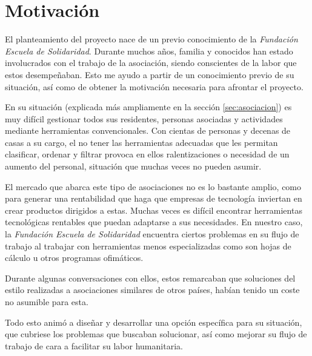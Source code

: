 \section{Motivación}

El planteamiento del proyecto nace de un previo conocimiento de la \textit{Fundación Escuela de Solidaridad}. Durante muchos años, familia y conocidos han estado involucrados con el trabajo de la asociación, siendo conscientes de la labor que estos desempeñaban. Esto me ayudo a partir de un conocimiento previo de su situación, así como de obtener la motivación necesaria para afrontar el proyecto.

En su situación (explicada más ampliamente en la sección \ref{sec:asociacion}) es muy difícil gestionar todos sus residentes, personas asociadas y actividades mediante herramientas convencionales. Con cientas de personas y decenas de casas a su cargo, el no tener las herramientas adecuadas que les permitan clasificar, ordenar y filtrar provoca en ellos ralentizaciones o necesidad de un aumento del personal, situación que muchas veces no pueden asumir. 

El mercado que abarca este tipo de asociaciones no es lo bastante amplio, como para generar una rentabilidad que haga que empresas de tecnología inviertan en crear productos dirigidos a estas. Muchas veces es difícil encontrar herramientas tecnológicas rentables que puedan adaptarse a sus necesidades. En nuestro caso, la \textit{Fundación Escuela de Solidaridad} encuentra ciertos problemas en su flujo de trabajo al trabajar con herramientas menos especializadas como son hojas de cálculo u otros programas ofimáticos. 

Durante algunas conversaciones con ellos, estos remarcaban que soluciones del estilo realizadas a asociaciones similares de otros países, habían tenido un coste no asumible para esta.

Todo esto animó a diseñar y desarrollar una opción específica para su situación, que cubriese los problemas que buscaban solucionar, así como mejorar su flujo de trabajo de cara a facilitar su labor humanitaria.  